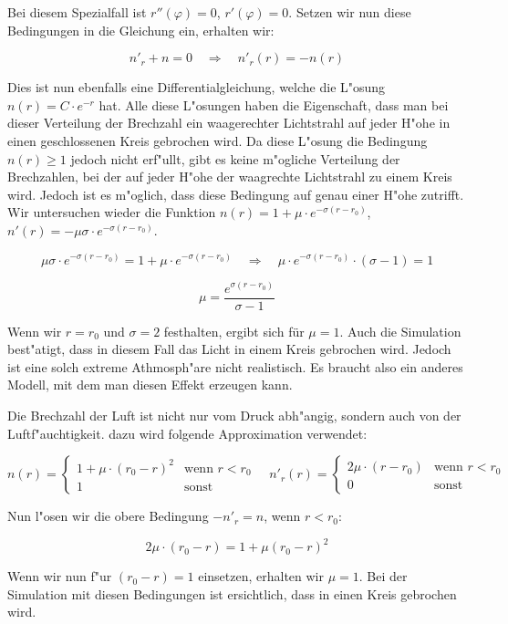 Bei diesem Spezialfall ist $r''(\varphi) = 0$, $r'(\varphi) = 0$. 
Setzen wir nun diese Bedingungen in die Gleichung ein, erhalten wir:

$$n'_r + n = 0 \quad \Rightarrow \quad n'_r(r) = -n(r)$$

Dies ist nun ebenfalls eine Differentialgleichung, welche die L"osung $n(r) = C \cdot e^{-r}$ hat.
Alle diese L"osungen haben die Eigenschaft, dass man bei dieser Verteilung der Brechzahl ein waagerechter Lichtstrahl auf jeder H"ohe in einen geschlossenen Kreis gebrochen wird.
Da diese L"osung die Bedingung $n(r) \geq 1$ jedoch nicht erf"ullt, gibt es keine m"ogliche Verteilung der Brechzahlen, bei der auf jeder H"ohe der waagrechte Lichtstrahl zu einem Kreis wird. 
Jedoch ist es m"oglich, dass diese Bedingung auf genau einer H"ohe zutrifft. 
Wir untersuchen wieder die Funktion $n(r) = 1 + \mu \cdot e^{-\sigma (r-r_0)}$, $n'(r) = -\mu \sigma \cdot e^{-\sigma (r-r_0)}$.

$$\mu \sigma \cdot e^{-\sigma (r-r_0)} = 1 + \mu \cdot e^{-\sigma (r-r_0)} \quad \Rightarrow \quad \mu \cdot e^{-\sigma (r-r_0)} \cdot (\sigma - 1) = 1$$

$$\mu = \frac{e^{\sigma (r-r_0)}}{\sigma - 1}$$

Wenn wir $r = r_0$ und $\sigma = 2$ festhalten, ergibt sich für $\mu = 1$. 
Auch die Simulation best"atigt, dass in diesem Fall das Licht in einem Kreis gebrochen wird.
Jedoch ist eine solch extreme Athmosph"are nicht realistisch. 
Es braucht also ein anderes Modell, mit dem man diesen Effekt erzeugen kann.

Die Brechzahl der Luft ist nicht nur vom Druck abh"angig, sondern auch von der Luftf"auchtigkeit. 
dazu wird folgende Approximation verwendet:

$$n(r) = \left\{ \begin{array}{ll} 1 + \mu \cdot (r_0 - r)^2 & \text{wenn } r < r_0 \\ 1 & \text{sonst} \end{array} \right. \quad n'_r(r) = \left\{ \begin{array}{ll} 2\mu \cdot (r - r_0) & \text{wenn } r < r_0 \\ 0 & \text{sonst} \end{array} \right.$$

Nun l"osen wir die obere Bedingung $-n'_r = n $, wenn $r < r_0$:

$$2\mu \cdot (r_0 - r) = 1 + \mu(r_0 - r)^2$$

Wenn wir nun f"ur $(r_0 - r) = 1$ einsetzen, erhalten wir $\mu = 1$. 
Bei der Simulation mit diesen Bedingungen ist ersichtlich, dass in einen Kreis gebrochen wird. 

